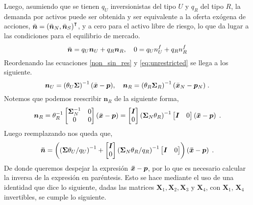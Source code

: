 \documentclass{article}
\begin{document}
Luego, asumiendo que se tienen $q_{U}$ inversionistas del tipo $U$ y $q_{R}$ del tipo $R$, la demanda por activos puede ser obtenida y ser equivalente a la oferta exógena de acciones, $\Bar{\bm{n}} = \left(\Bar{\bm{n}}_{N},\Bar{\bm{n}}_{S}\right)^{\intercal}$, y a cero para el activo libre de riesgo, lo que da lugar a las condiciones para el equilibrio de mercado.
\begin{equation}
    \Bar{\bm{n}} = q_{U}\bm{n}_{U} + q_{R}\bm{n}_{R},\quad 0 = q_{U}n^{f}_{U} + q_{R}n^{f}_{R}\label{market eq.}
\end{equation}
Reordenando las ecuaciones \eqref{non_sin_res} y \eqref{eq:unrestricted} se llega a los siguiente.
\begin{equation*}
    \bm{n}_{U} = \left(\theta_{U}\bm{\Sigma}\right)^{-1}(\Bar{\bm{x}} - \bm{p}),\quad \bm{n}_{R} = \left(\theta_{R}\bm{\Sigma}_{R}\right)^{-1}(\Bar{\bm{x}}_{N} - \bm{p}_{N})\;. 
\end{equation*}
Notemos que podemos reescribir $\bm{n}_R$ de la siguiente forma,
\begin{equation*}
	\bm{n}_R = \theta^{-1}_{R}\begin{bmatrix}
		\bm{\Sigma}^{-1}_{N} & 0\\
		0 & 0
	\end{bmatrix}
	(\Bar{\bm{x}}-\bm{p}) = \begin{bmatrix}
		\bm{I}\\
		0
	\end{bmatrix}
	\left(\bm{\Sigma}_N\theta_R\right)^{-1}\begin{bmatrix}
		\bm{I} & 0
	\end{bmatrix}
	\left(\bm{\Bar{x}}-\bm{p}\right)\;.
\end{equation*}
Luego reemplazando nos queda que,
\begin{equation}
	\bm{\Bar{n}}=\left(\left(\bm{\Sigma}\theta_U/q_U\right)^{-1}+\begin{bmatrix}
		\bm{I}\\
		0
	\end{bmatrix}
	\left(\bm{\Sigma}_N \theta_R/q_R\right)^{-1}\begin{bmatrix}
		\bm{I} & 0
	\end{bmatrix}\right)\left(\bm{\Bar{\bm{x}}}-\bm{p}\right)\;.
	\label{eq:dem_exogena}
\end{equation}
De donde queremos despejar la expresión $\bm{\Bar{x}}-\bm{p}$, por lo que es necesario calcular la inversa de la expresión en paréntesis. Esto se hace mediante el uso de una identidad que dice lo siguiente, dadas las matrices $\bm{X}_1, \bm{X}_2, \bm{X}_3 \text{ y } \bm{X}_4$, con $\bm{X}_1$, $\bm{X}_4$ invertibles, se cumple lo siguiente.
\end{document}
